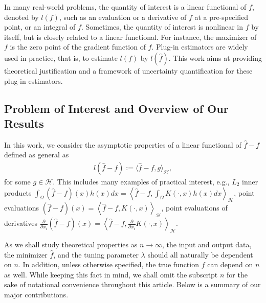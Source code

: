 \documentclass[12pt]{article}
\theoremstyle{plain}
\theoremstyle{remark}
\begin{document}
In many real-world problems, the quantity of interest is a linear functional of $f$, denoted by $l(f)$, such as an  evaluation or a derivative of $f$ at a pre-specified point, or an integral of $f$. Sometimes, the quantity of interest is nonlinear in $f$ by itself, but is closely related to a linear functional. For instance, the maximizer of $f$ is the zero point of the gradient function of $f$. Plug-in estimators are widely used in practice, that is, to estimate $l(f)$ by $l(\hat{f})$. This work aims at providing theoretical justification and a framework of uncertainty quantification for these plug-in estimators.




\subsection{Problem of Interest and Overview of Our Results}

In this work, we consider the asymptotic properties of a linear functional of $\hat{f}-f$ defined as general as 
\begin{eqnarray}\label{PoI}
    l(\hat{f}-f):=\langle \hat{f}-f,g\rangle_\mathcal{H},
\end{eqnarray}
for some $g\in\mathcal{H}$.
This includes many examples of practical interest, e.g., 
$L_2$ inner products $\int_\Omega (\hat{f}-f)(x)h(x)dx=\left\langle \hat{f}-f,\int_\Omega K(\cdot,x)h(x)dx\right\rangle_\mathcal{H}$,
point evaluations $(\hat{f}-f)(x)=\left\langle \hat{f}-f,K(\cdot,x)\right\rangle_\mathcal{H}$, 
point evaluations of derivatives $\frac{\partial}{\partial x_i}(\hat{f}-f)(x)=\left\langle \hat{f}-f,\frac{\partial}{\partial x_i}K(\cdot,x)\right\rangle_\mathcal{H}$.

As we shall study theoretical properties as $n\rightarrow \infty$, the input and output data, the minimizer $\hat{f}$, and the tuning parameter $\lambda$ should all naturally be dependent on $n$. In addition, unless otherwise specified, the true function $f$ can depend on $n$ as well. While keeping this fact in mind, we shall omit the subscript $n$ for the sake of notational convenience throughout this article.
Below is a summary of our major contributions.
\end{document}
